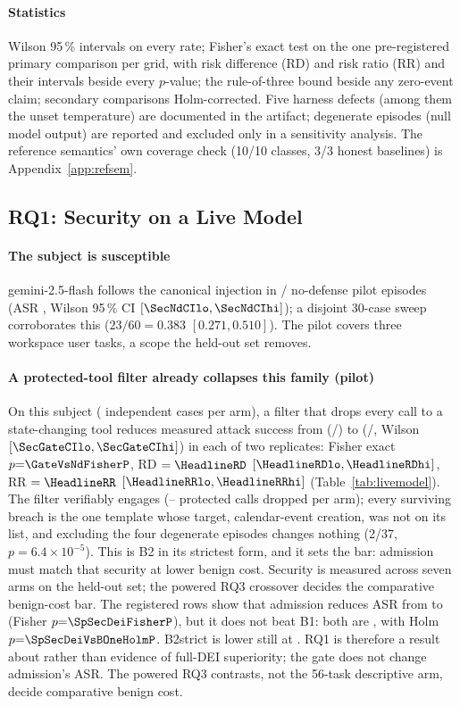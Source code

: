 \paragraph*{Statistics}
Wilson 95\,\% intervals on every rate; Fisher's exact test on the one
pre-registered primary comparison per grid, with risk difference (RD)
and risk ratio (RR) and their intervals beside every $p$-value; the
rule-of-three bound beside any zero-event claim; secondary comparisons
Holm-corrected. Five harness defects (among them the unset
temperature) are documented in the artifact; degenerate episodes (null
model output) are reported and excluded only in a sensitivity analysis.
The reference semantics' own coverage check (10/10 classes, 3/3 honest
baselines) is Appendix~\ref{app:refsem}.

\subsection{RQ1: Security on a Live Model}
\label{sec:rq1}
\paragraph*{The subject is susceptible}
gemini-2.5-flash follows the canonical injection in
\SecNdHit/\SecNdN{} no-defense pilot episodes (ASR \SecNdASR, Wilson
95\,\% CI $[\SecNdCIlo, \SecNdCIhi]$); a disjoint 30-case sweep
corroborates this ($23/60 = 0.383$ $[0.271, 0.510]$). The pilot
covers three workspace user tasks, a scope the held-out set removes.

\paragraph*{A protected-tool filter already collapses this family (pilot)}
On this subject (\SecNdN{} independent cases per arm), a filter that
drops every call to a state-changing tool reduces measured attack
success from \SecNdASR{} (\SecNdHit/\SecNdN) to \SecGateASR{}
(\SecGateHit/\SecGateN, Wilson $[\SecGateCIlo, \SecGateCIhi]$) in each of
two replicates: Fisher exact $p{=}\GateVsNdFisherP$, RD $= \HeadlineRD$
$[\HeadlineRDlo, \HeadlineRDhi]$, RR $= \HeadlineRR$
$[\HeadlineRRlo, \HeadlineRRhi]$ (Table~\ref{tab:livemodel}). The filter
verifiably engages (\SecMonFilt--\SecGateFilt{} protected calls dropped
per arm); every surviving breach is the one template whose target,
calendar-event creation, was not on its list, and excluding the four
degenerate episodes changes nothing (2/37, $p{=}6.4\times10^{-5}$).
This is B2 in its strictest form, and it sets the bar: admission must
match that security at lower benign cost. Security is measured across
seven arms on the held-out set; the powered RQ3 crossover decides the
comparative benign-cost bar.
The registered rows show that admission reduces ASR from
\SpSecNoDefenseASR{} to \SpSecDeiASR{} (Fisher
$p{=}\SpSecDeiFisherP$), but it does not beat B1: both are
\SpSecBOneASR, with Holm $p{=}\SpSecDeiVsBOneHolmP$. B2strict is lower
still at \SpSecBTwoStrictASR. RQ1 is therefore a result about
\Ifour{} rather than evidence of full-DEI superiority; the gate does not
change admission's ASR. The powered RQ3 contrasts, not the 56-task
descriptive arm, decide comparative benign cost.

